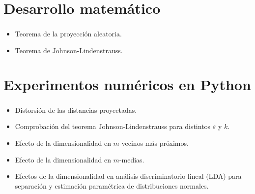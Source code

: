 \documentclass[
    12pt,
    aspectratio=1610,
    c,
    spanish,
    intlimits,
    handout,
    leqno,
    professionalfonts,
]{beamer}
\begin{document}
\section{Desarrollo matemático}

\begin{frame}
	\frametitle{\insertsection}

	\begin{itemize}
		\item

		      Teorema de la proyección aleatoria.

		\item

		      Teorema de Johnson-Lindenstrauss.
	\end{itemize}

\end{frame}

\section{Experimentos numéricos en Python}

\begin{frame}
	\frametitle{\insertsection}

	\begin{itemize}
		\item

		      Distorsión de las distancias proyectadas.

		\item

		      Comprobación del teorema Johnson-Lindenstrauss para distintos $\varepsilon$ y $k$.

		\item

		      Efecto de la dimensionalidad en $m$-vecinos más próximos.

		\item

		      Efecto de la dimensionalidad en $m$-medias.

		\item

		      Efectos de la dimensionalidad en análisis discriminatorio lineal (LDA) para separación y estimación paramétrica de distribuciones normales.

	\end{itemize}
\end{frame}
\end{document}
